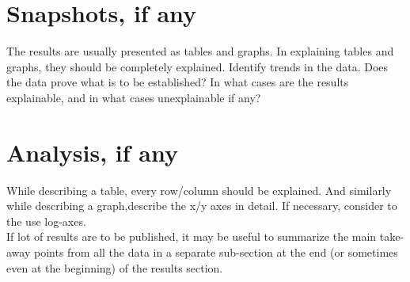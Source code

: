 \section{Snapshots, if any}
The results are usually presented as tables and graphs. In explaining tables and graphs, they should be completely explained. Identify trends in the data. Does the data prove what is to be established? In what cases are the results explainable, and in what cases unexplainable if any? \\

\section{Analysis, if any}
While describing a table, every row/column should be explained. And similarly while describing a graph,describe the x/y axes in detail. If necessary, consider to  the use  log-axes. \\
If lot of results are to be published, it may be useful to summarize the main take-away points from all the data in a separate sub-section at the end (or sometimes even at the beginning) of the results section. \\

